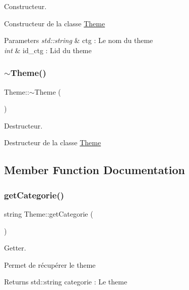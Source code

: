 Constructeur. 

Constructeur de la classe \mbox{\hyperlink{classTheme}{Theme}}


\begin{DoxyParams}{Parameters}
{\em std\+::string} & ctg \+: Le nom du theme \\
\hline
{\em int} & id\+\_\+ctg \+: L\textquotesingle{}id du theme \\
\hline
\end{DoxyParams}
\mbox{\label{classTheme_afc1ece6aa5135b98e14dddac7dddbda8}} 
\subsubsection{\texorpdfstring{$\sim$\+Theme()}{~Theme()}}
{\footnotesize\ttfamily Theme\+::$\sim$\+Theme (\begin{DoxyParamCaption}{ }\end{DoxyParamCaption})}



Destructeur. 

Destructeur de la classe \mbox{\hyperlink{classTheme}{Theme}} 

\subsection{Member Function Documentation}
\mbox{\label{classTheme_a3107feac34af5ae1f6422ee4187c349c}} 
\subsubsection{\texorpdfstring{get\+Categorie()}{getCategorie()}}
{\footnotesize\ttfamily string Theme\+::get\+Categorie (\begin{DoxyParamCaption}{ }\end{DoxyParamCaption})}



Getter. 

Permet de récupérer le theme \begin{DoxyReturn}{Returns}
std\+::string categorie \+: Le theme 
\end{DoxyReturn}
\mbox{\label{classTheme_ae89eff94270ba058da2a78f974271bab}} 
